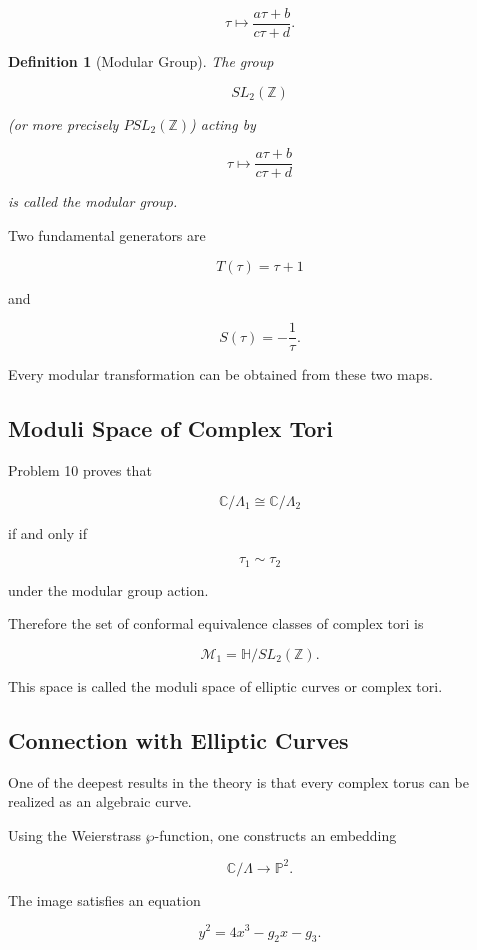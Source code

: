 \documentclass[12pt,a4paper]{article}
\theoremstyle{notespace}
\newtheorem{definition}{Definition}[subsection]
\begin{document}
\[
\tau
\mapsto
\frac{a\tau+b}{c\tau+d}.
\]

\begin{definition}[Modular Group]
	The group
	
	\[
	SL_2(\mathbb Z)
	\]
	
	(or more precisely \(PSL_2(\mathbb Z)\))
	acting by
	
	\[
	\tau
	\mapsto
	\frac{a\tau+b}{c\tau+d}
	\]
	
	is called the modular group.
\end{definition}

Two fundamental generators are

\[
T(\tau)=\tau+1
\]

and

\[
S(\tau)
=
-\frac1\tau.
\]

Every modular transformation can be obtained from these two maps.

\subsection{Moduli Space of Complex Tori}

Problem 10 proves that

\[
\mathbb C/\Lambda_1
\cong
\mathbb C/\Lambda_2
\]

if and only if

\[
\tau_1
\sim
\tau_2
\]

under the modular group action.

Therefore the set of conformal equivalence classes of complex tori is

\[
\boxed{
	\mathcal M_1
	=
	\mathbb H/SL_2(\mathbb Z).
}
\]

This space is called the moduli space of elliptic curves or complex
tori.

\subsection{Connection with Elliptic Curves}

One of the deepest results in the theory is that every complex torus can
be realized as an algebraic curve.

Using the Weierstrass \(\wp\)-function, one constructs an embedding

\[
\mathbb C/\Lambda
\longrightarrow
\mathbb P^2.
\]

The image satisfies an equation

\[
y^2
=
4x^3-g_2x-g_3.
\]
\end{document}
